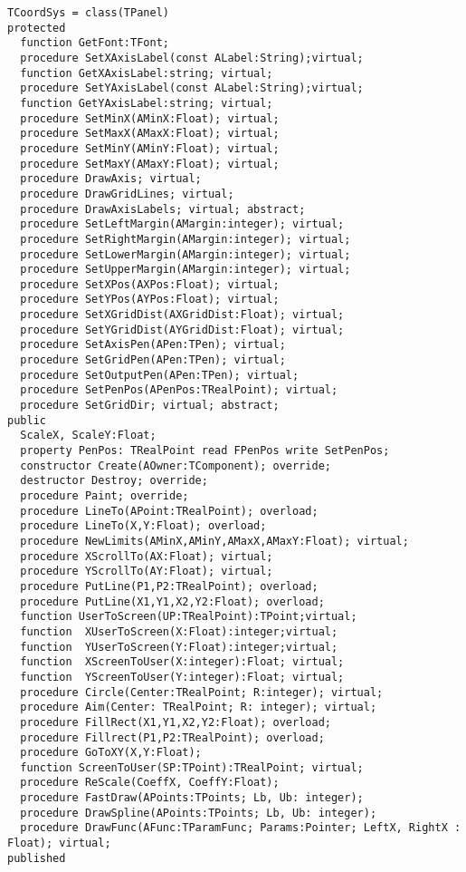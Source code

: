 \documentclass[12pt,a4paper,oneside]{report}
\begin{document}
\begin{verbatim}
TCoordSys = class(TPanel)
protected
  function GetFont:TFont;
  procedure SetXAxisLabel(const ALabel:String);virtual;
  function GetXAxisLabel:string; virtual;
  procedure SetYAxisLabel(const ALabel:String);virtual;
  function GetYAxisLabel:string; virtual;
  procedure SetMinX(AMinX:Float); virtual;
  procedure SetMaxX(AMaxX:Float); virtual;
  procedure SetMinY(AMinY:Float); virtual;
  procedure SetMaxY(AMaxY:Float); virtual;
  procedure DrawAxis; virtual;
  procedure DrawGridLines; virtual;
  procedure DrawAxisLabels; virtual; abstract; 
  procedure SetLeftMargin(AMargin:integer); virtual;
  procedure SetRightMargin(AMargin:integer); virtual;
  procedure SetLowerMargin(AMargin:integer); virtual;
  procedure SetUpperMargin(AMargin:integer); virtual;
  procedure SetXPos(AXPos:Float); virtual;
  procedure SetYPos(AYPos:Float); virtual;
  procedure SetXGridDist(AXGridDist:Float); virtual;
  procedure SetYGridDist(AYGridDist:Float); virtual;
  procedure SetAxisPen(APen:TPen); virtual;
  procedure SetGridPen(APen:TPen); virtual;
  procedure SetOutputPen(APen:TPen); virtual;
  procedure SetPenPos(APenPos:TRealPoint); virtual;
  procedure SetGridDir; virtual; abstract;
public
  ScaleX, ScaleY:Float;
  property PenPos: TRealPoint read FPenPos write SetPenPos;
  constructor Create(AOwner:TComponent); override;
  destructor Destroy; override;
  procedure Paint; override;
  procedure LineTo(APoint:TRealPoint); overload; 
  procedure LineTo(X,Y:Float); overload;
  procedure NewLimits(AMinX,AMinY,AMaxX,AMaxY:Float); virtual;
  procedure XScrollTo(AX:Float); virtual;
  procedure YScrollTo(AY:Float); virtual;
  procedure PutLine(P1,P2:TRealPoint); overload;
  procedure PutLine(X1,Y1,X2,Y2:Float); overload;
  function UserToScreen(UP:TRealPoint):TPoint;virtual;
  function  XUserToScreen(X:Float):integer;virtual;
  function  YUserToScreen(Y:Float):integer;virtual;
  function  XScreenToUser(X:integer):Float; virtual;
  function  YScreenToUser(Y:integer):Float; virtual;
  procedure Circle(Center:TRealPoint; R:integer); virtual;
  procedure Aim(Center: TRealPoint; R: integer); virtual;
  procedure FillRect(X1,Y1,X2,Y2:Float); overload;
  procedure Fillrect(P1,P2:TRealPoint); overload;
  procedure GoToXY(X,Y:Float);
  function ScreenToUser(SP:TPoint):TRealPoint; virtual;
  procedure ReScale(CoeffX, CoeffY:Float);
  procedure FastDraw(APoints:TPoints; Lb, Ub: integer);
  procedure DrawSpline(APoints:TPoints; Lb, Ub: integer);
  procedure DrawFunc(AFunc:TParamFunc; Params:Pointer; LeftX, RightX : Float); virtual;
published                                    

\end{verbatim}
\end{document}
